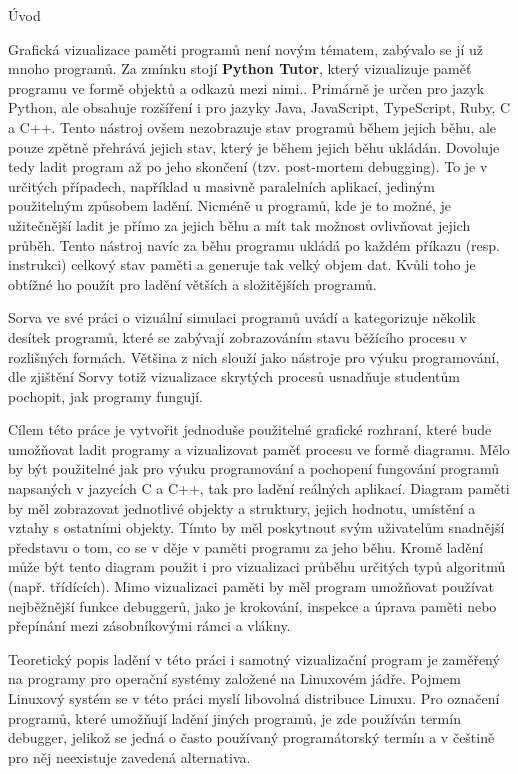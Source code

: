 \documentclass[czech,bachelor,male,python,dept460]{diploma}						%
\newcommand{\parspace}[1][]{
	\ifthenelse{\isempty{#1}}{\vspace{5mm}}{\vspace{#1}}
	\par
}
\begin{document}
\begin{section}{Úvod}
	\parspace Grafická vizualizace paměti programů není novým tématem, zabývalo se jí už mnoho programů. Za zmínku stojí \textbf{Python Tutor}, který vizualizuje
	paměť programu ve formě objektů a odkazů mezi nimi.\cite{GuoSIGCSE2013}.
	Primárně je určen pro jazyk Python, ale obsahuje rozšíření i pro jazyky Java, JavaScript, TypeScript, Ruby, C a C++.
	Tento nástroj ovšem nezobrazuje stav programů během jejich běhu, ale pouze zpětně přehrává jejich stav, který je během jejich běhu ukládán.
	Dovoluje tedy ladit program až po jeho skončení (tzv. post-mortem debugging). To je v určitých případech, například u masivně
	paralelních aplikací, jediným použitelným způsobem ladění. Nicméně u programů, kde je to možné, je užitečnější ladit je přímo za jejich běhu a mít
	tak možnost ovlivňovat jejich průběh. Tento nástroj navíc za běhu programu ukládá po každém příkazu (resp. instrukci) celkový stav paměti
	a generuje tak velký objem dat. Kvůli toho je obtížné ho použít pro ladění větších a složitějších programů.
	
	\parspace Sorva ve své práci o vizuální simulaci programů uvádí a kategorizuje několik desítek programů, které se zabývají zobrazováním stavu běžícího
	procesu v rozlišných formách\cite[140]{sorva2012visual}. Většina z nich slouží jako nástroje pro výuku programování, dle zjištění Sorvy totiž vizualizace
	skrytých procesů usnadňuje studentům pochopit, jak programy fungují. \cite[212]{sorva2012visual}
	
	\parspace Cílem této práce je vytvořit jednoduše použitelné grafické rozhraní, které bude umožňovat ladit programy a vizualizovat paměť procesu
	ve formě diagramu. Mělo by být použitelné jak pro výuku programování a pochopení fungování programů napsaných v jazycích C a C++, tak pro ladění reálných
	aplikací. Diagram paměti by měl zobrazovat jednotlivé objekty a struktury, jejich hodnotu, umístění a vztahy s ostatními objekty.
	Tímto by měl poskytnout svým uživatelům snadnější představu o tom, co se v děje v paměti programu za jeho běhu.
	Kromě ladění může být tento diagram použit i pro vizualizaci průběhu určitých typů algoritmů (např. třídících). Mimo vizualizaci paměti by měl program
	umožňovat používat nejběžnější funkce debuggerů, jako je krokování, inspekce a úprava paměti nebo přepínání mezi zásobníkovými rámci a vlákny.
	
	\parspace Teoretický popis ladění v této práci i samotný vizualizační program je zaměřený na programy pro operační systémy založené na Linuxovém jádře.
	Pojmem Linuxový systém se v této práci myslí libovolná distribuce Linuxu. Pro označení programů, které umožňují ladění jiných programů,
	je zde používán termín debugger, jelikož se jedná o často používaný programátorský termín a v češtině pro něj neexistuje zavedená alternativa.


\end{section}
\end{document}
